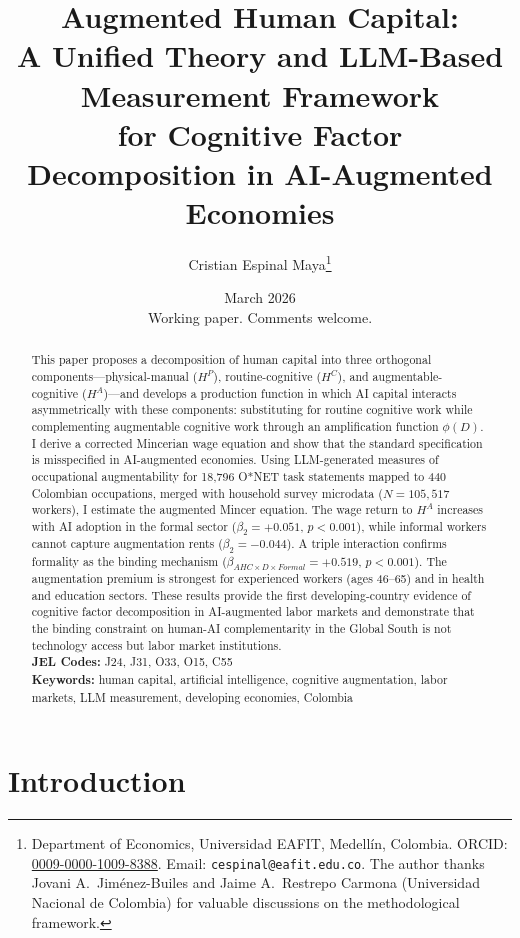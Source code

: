 \documentclass[11pt,a4paper]{article}
\title{\textbf{Augmented Human Capital:}\\[4pt]
A Unified Theory and LLM-Based Measurement Framework\\
for Cognitive Factor Decomposition in AI-Augmented Economies}
\author{Cristian Espinal Maya\thanks{Department of Economics, Universidad EAFIT, Medell\'in, Colombia. ORCID: \href{https://orcid.org/0009-0000-1009-8388}{0009-0000-1009-8388}. Email: \texttt{cespinal@eafit.edu.co}. The author thanks Jovani A.\ Jim\'enez-Builes and Jaime A.\ Restrepo Carmona (Universidad Nacional de Colombia) for valuable discussions on the methodological framework.}}
\date{March 2026\\[6pt]
{\small Working paper. Comments welcome.}}
\theoremstyle{definition}
\begin{document}
\maketitle

\begin{abstract}
\noindent
This paper proposes a decomposition of human capital into three orthogonal components---physical-manual ($H^P$), routine-cognitive ($H^C$), and augmentable-cognitive ($H^A$)---and develops a production function in which AI capital interacts asymmetrically with these components: substituting for routine cognitive work while complementing augmentable cognitive work through an amplification function $\phi(D)$. I derive a corrected Mincerian wage equation and show that the standard specification is misspecified in AI-augmented economies. Using LLM-generated measures of occupational augmentability for 18,796 O*NET task statements mapped to 440 Colombian occupations, merged with household survey microdata ($N = 105{,}517$ workers), I estimate the augmented Mincer equation. The wage return to $H^A$ increases with AI adoption in the formal sector ($\beta_2 = +0.051$, $p < 0.001$), while informal workers cannot capture augmentation rents ($\beta_2 = -0.044$). A triple interaction confirms formality as the binding mechanism ($\beta_{AHC \times D \times Formal} = +0.519$, $p < 0.001$). The augmentation premium is strongest for experienced workers (ages 46--65) and in health and education sectors. These results provide the first developing-country evidence of cognitive factor decomposition in AI-augmented labor markets and demonstrate that the binding constraint on human-AI complementarity in the Global South is not technology access but labor market institutions.\\[6pt]
\noindent\textbf{JEL Codes:} J24, J31, O33, O15, C55\\[3pt]
\noindent\textbf{Keywords:} human capital, artificial intelligence, cognitive augmentation, labor markets, LLM measurement, developing economies, Colombia
\end{abstract}

\newpage
\tableofcontents
\newpage


\section{Introduction}
\label{sec:intro}
\end{document}
